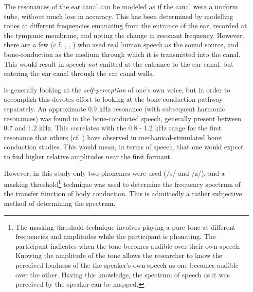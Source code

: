 
The resonances of the ear canal can be modeled as if the canal were a uniform tube, without much loss in accuracy.  This has been determined by modelling tones at different frequencies emanating from the entrance of the ear, recorded at the tympanic membrane, and noting the change in resonant frequency.  However, there are a few (c.f. \cite{bekesy:48}, \cite{porschmann:00}, \cite{reinfeldt:10}) who used real human speech as the sound source, and bone-conduction as the medium through which it is transmitted into the canal.  This would result in speech \textit{not} emitted at the entrance to the ear canal, but entering the ear canal through the ear canal walls.
%

\cite{porschmann:00} is generally looking at the \textit{self-perception} of one's own voice, but in order to accomplish this devotes effort to looking at the bone conduction pathway separately.  An approximate 0.9 kHz resonance (with subsequent harmonic resonances) was found in the bone-conducted speech, generally present between 0.7 and 1.2 kHz.  This correlates with the 0.8 - 1.2 kHz range for the first resonance that others (cf. \cite{hakansson:94}) have observed in mechanical-stimulated bone conduction studies. This would mean, in terms of speech, that one would expect to find higher relative amplitudes near the first formant.

However, in this study only two phonemes were used (/s/ and /z/), and a masking threshold\footnote{The masking threshold technique involves playing a pure tone at different frequencies and amplitudes while the participant is phonating. The participant indicates when the tone becomes audible over their own speech. Knowing the amplitude of the tone allows the researcher to know the perceived loudness of the the speaker's own speech as one becomes audible over the other. Having this knowledge, the spectrum of speech as it was perceived by the speaker can be mapped.} technique was used to determine the frequency spectrum of the transfer function of body conduction.  This is admittedly a rather subjective method of determining the spectrum.  

